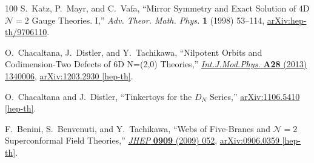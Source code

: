 \begin{thebibliography}{100}
S.~Katz, P.~Mayr, and C.~Vafa, ``{Mirror Symmetry and Exact Solution of 4D ${\mathcal{N}}\!=2$ Gauge Theories. I},'' {\em Adv. Theor. Math. Phys.} {\bfseries 1} (1998) 53--114,
\href{http://arxiv.org/abs/hep-th/9706110}{{\ttfamily arXiv:hep-th/9706110}}.

O.~Chacaltana, J.~Distler, and Y.~Tachikawa, ``{Nilpotent Orbits and Codimension-Two Defects of 6D N=(2,0) Theories},''
\href{http://dx.doi.org/10.1142/S0217751X1340006X}{{\em Int.J.Mod.Phys.} {\bfseries A28} (2013) 1340006},
\href{http://arxiv.org/abs/1203.2930}{{\ttfamily arXiv:1203.2930 [hep-th]}}.

O.~Chacaltana and J.~Distler, ``{Tinkertoys for the $D_N$ Series},''
\href{http://arxiv.org/abs/1106.5410}{{\ttfamily arXiv:1106.5410 [hep-th]}}.

F.~Benini, S.~Benvenuti, and Y.~Tachikawa, ``{Webs of Five-Branes and ${\mathcal{N}}\!=2$ Superconformal Field Theories},''
\href{http://dx.doi.org/10.1088/1126-6708/2009/09/052}{{\em JHEP} {\bfseries 0909} (2009) 052},
\href{http://arxiv.org/abs/0906.0359}{{\ttfamily arXiv:0906.0359 [hep-th]}}.

\end{thebibliography}\endgroup
